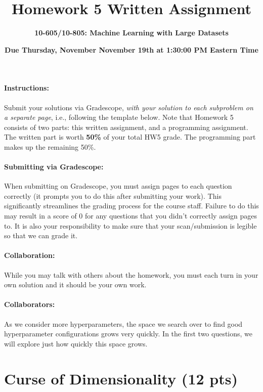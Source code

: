 \documentclass{exam}
\begin{document}
\title{Homework 5 Written Assignment}
\author{\Large \bf 10-605/10-805: Machine Learning with Large Datasets}
\date{{\bf Due Thursday, November \Large{November 19}th at 1:30:00 PM Eastern Time}}
\maketitle

\paragraph{Instructions:} Submit your solutions via Gradescope, \textit{with your solution to each subproblem on a separate page}, i.e., following the template below.  Note that Homework 5 consists of two parts: this written assignment, and a programming assignment. The written part is worth \textbf{50\%} of your total HW5 grade. The programming part makes up the remaining 50\%.

\paragraph{Submitting via Gradescope:} When submitting on Gradescope, you must assign pages to each question correctly (it
prompts you to do this after submitting your work). This significantly streamlines the
grading process for the course staff.  Failure to do this may result in a score of 0 for any questions
that you didn't correctly assign pages to. It is also your responsibility to make sure that your scan/submission is legible so that we can grade it.

\paragraph{Collaboration:}  While you may talk with others about the homework, you must each turn in your own solution and it should be your own work. 

\paragraph{Collaborators:}


\newpage
\noindent As we consider more hyperparameters, the space we search over to find good hyperparameter configurations grows very quickly. In the first two questions, we will explore just how quickly this space grows.

\section{Curse of Dimensionality (\Large{12} pts)}
\end{document}
